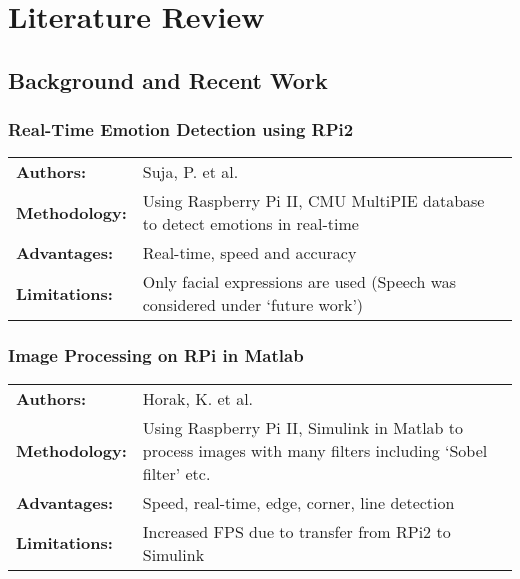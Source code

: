 \chapter{Literature Review}

\section{Background and Recent Work}

\subsection{Real-Time Emotion Detection using RPi2}
\begin{table}[h]
\centering
\bgroup
\def\arraystretch{1.5}
\begin{tabularx}{\linewidth}{l X}
\textbf{Authors:} & Suja, P. et al. \cite{suja2016} \\
\textbf{Methodology:} & Using Raspberry Pi II, CMU MultiPIE database to detect emotions in real-time \\ 
\textbf{Advantages:} & Real-time, speed and accuracy \\
\textbf{Limitations:} & Only facial expressions are used (Speech was considered under `future work') \\
\end{tabularx}
\egroup
\end{table}

\subsection{Image Processing on RPi in Matlab}
\begin{table}[h]
\centering
\bgroup
\def\arraystretch{1.5}
\begin{tabularx}{\linewidth}{l X}
\textbf{Authors:} & Horak, K. et al. \cite{horak2015} \\
\textbf{Methodology:} & Using Raspberry Pi II, Simulink in Matlab to process images with many filters including `Sobel filter' etc. \\ 
\textbf{Advantages:} & Speed, real-time, edge, corner, line detection \\
\textbf{Limitations:} & Increased FPS due to transfer from RPi2 to Simulink \\
\end{tabularx}
\egroup
\end{table}
\pagebreak

